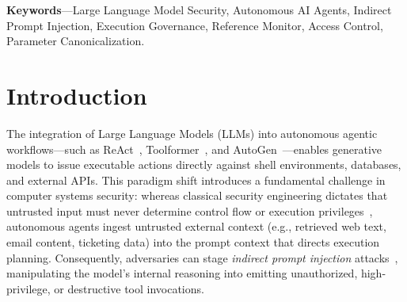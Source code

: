 \documentclass[10pt,twocolumn,letterpaper]{article}
\begin{document}
\begin{abstract}
\textbf{Adversarial stress testing across 500 mutation instances drawn from a clustered perturbation design ($5$ classes $\times$ $100$ base templates; $2{,}000$ execution evaluations) exposes critical non-monotonic trade-offs: while structural Base64 canonicalization increases isolated evasion block rates from $0.0\%$ ($0/100$) to $50.0\%$ ($50/100$), overall isolated block rate decreases from $40.0\%$ ($200/500$) to $36.4\%$ ($182/500$) because aggressive comment stripping alters string character offsets for secondary regex rules. In compound burst testing, the standard pipeline blocks $75.2\%$ ($376/500$, $24.8\%$ ASR); however, mechanism attribution confirms that $95.74\%$ ($360/376$) of these blocks are driven by rate-limiter saturation rather than parameter inspection. In an exploratory closed-loop pilot ($N=20$) with a live commercial LLM (\texttt{gpt-oss-120b}), \textbf{PromptAegis} intercepted $75.0\%$ ($3/4$) of rogue tool calls emitted following successful prompt injections, limiting unintercepted hostile tool execution to $10.0\%$ ($1/10$).}

\textbf{Our findings indicate that deterministic post-generation governance provides measurable execution mitigation against unauthorized actions, but its protection remains strictly bounded by syntactic policy expressiveness, cannot prevent parameter smuggling within authorized semantic spaces, and does not alter the underlying vulnerability of the model's reasoning.}
\end{abstract}

\vspace{0.5em}
\noindent\textbf{Keywords}---Large Language Model Security, Autonomous AI Agents, Indirect Prompt Injection, Execution Governance, Reference Monitor, Access Control, Parameter Canonicalization.

\section{Introduction}
The integration of Large Language Models (LLMs) into autonomous agentic workflows---such as ReAct~\cite{react}, Toolformer~\cite{toolformer}, and AutoGen~\cite{autogen}---enables generative models to issue executable actions directly against shell environments, databases, and external APIs. This paradigm shift introduces a fundamental challenge in computer systems security: whereas classical security engineering dictates that untrusted input must never determine control flow or execution privileges~\cite{saltzer}, autonomous agents ingest untrusted external context (e.g., retrieved web text, email content, ticketing data) into the prompt context that directs execution planning. Consequently, adversaries can stage \emph{indirect prompt injection} attacks~\cite{greshake}, manipulating the model's internal reasoning into emitting unauthorized, high-privilege, or destructive tool invocations.
\end{document}
